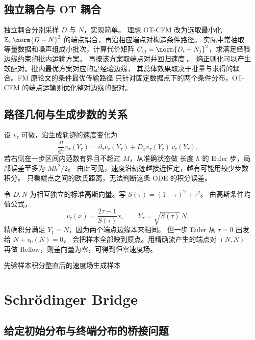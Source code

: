 \subsection{独立耦合与 OT 耦合}

独立耦合分别采样 \(D\) 与 \(N\)，实现简单。
理想 OT-CFM 改为选取最小化 \(\mathbb E_\pi\norm{D-N}^2\)
的端点耦合，再沿相应端点对构造条件路径。
实际中常抽取等量数据和噪声组成小批次，计算代价矩阵
\(C_{ij}=\norm{D_i-N_j}^2\)，求满足经验边缘约束的批内运输方案。
再按该方案取端点对并回归速度 \cite{tong2024otcfm}。
熵正则化可以产生软配对。批内最优方案对应的是经验边缘，
其总体效果取决于批量与求得的耦合。FM 原论文的条件最优传输路径
只针对固定数据点下的两个条件分布，OT-CFM 的端点运输则优化整对边缘的配对。

\subsection{路径几何与生成步数的关系}

设 \(v_\tau\) 可微，沿生成轨迹的速度变化为
\[
  \frac{\dd}{\dd\tau}v_\tau(Y_\tau)
     =\partial_\tau v_\tau(Y_\tau)
          +D_xv_\tau(Y_\tau)\,v_\tau(Y_\tau).
\]
若右侧在一步区间内范数有界且不超过 \(M\)，从准确状态做
长度 \(h\) 的 Euler 步，局部误差至多为 \(Mh^2/2\)。
由此可见，速度沿轨迹越接近恒定，越有可能用较少步数积分。
只看端点之间的欧氏距离，无法判断这条 ODE 的积分误差。

\begin{example}[训练直线与一步生成的差异]
令 \(D,N\) 为相互独立的标准高斯向量。写
\(S(\tau)=(1-\tau)^2+\tau^2\)。
由高斯条件均值公式，
\[
  v_\tau(x)=\frac{2\tau-1}{S(\tau)}x,\qquad
  Y_\tau=\sqrt{S(\tau)}\,N .
\]
精确积分满足 \(Y_1=N\)，因为两个端点边缘本来相同。
但一步 Euler 从 \(\tau=0\) 出发给 \(N+v_0(N)=0\)，
会把样本全部映到原点。用精确流产生的端点对 \((N,N)\) 再做
Reflow，则差向量为零，可得到恒零速度场。
\end{example}

  {先验样本}{积分整直后的速度场}{生成样本}
\pagebreak
\section{Schrödinger Bridge}
\label{sec:overview-schrodinger}

\subsection{给定初始分布与终端分布的桥接问题}

